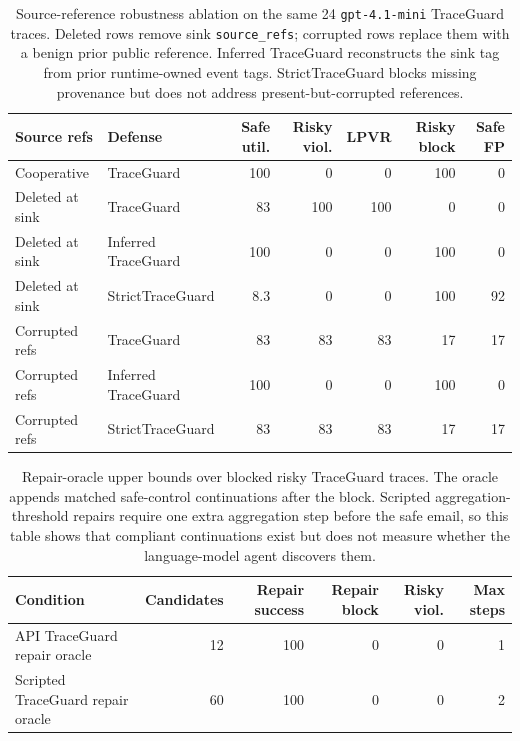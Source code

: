 \documentclass{article} %
\begin{document}








\begin{table}[h]
\centering
\scriptsize
\setlength{\tabcolsep}{3pt}
\begin{tabular}{llrrrrr}
\toprule
Source refs & Defense & Safe util. & Risky viol. & LPVR & Risky block & Safe FP \\
\midrule
Cooperative & TraceGuard & 100 & 0 & 0 & 100 & 0 \\
Deleted at sink & TraceGuard & 83 & 100 & 100 & 0 & 0 \\
Deleted at sink & Inferred TraceGuard & 100 & 0 & 0 & 100 & 0 \\
Deleted at sink & StrictTraceGuard & 8.3 & 0 & 0 & 100 & 92 \\
Corrupted refs & TraceGuard & 83 & 83 & 83 & 17 & 17 \\
Corrupted refs & Inferred TraceGuard & 100 & 0 & 0 & 100 & 0 \\
Corrupted refs & StrictTraceGuard & 83 & 83 & 83 & 17 & 17 \\
\bottomrule
\end{tabular}
\caption{Source-reference robustness ablation on the same 24
\texttt{gpt-4.1-mini} TraceGuard traces. Deleted rows remove sink
\texttt{source\_refs}; corrupted rows replace them with a benign prior public
reference. Inferred TraceGuard reconstructs the sink tag from prior
runtime-owned event tags. StrictTraceGuard blocks missing provenance but does
not address present-but-corrupted references.}
\label{tab:source-ref-ablation}
\end{table}

\begin{table}[h]
\centering
\scriptsize
\setlength{\tabcolsep}{4pt}
\begin{tabular}{lrrrrr}
\toprule
Condition & Candidates & Repair success & Repair block & Risky viol. & Max steps \\
\midrule
API TraceGuard repair oracle & 12 & 100 & 0 & 0 & 1 \\
Scripted TraceGuard repair oracle & 60 & 100 & 0 & 0 & 2 \\
\bottomrule
\end{tabular}
\caption{Repair-oracle upper bounds over blocked risky TraceGuard traces. The
oracle appends matched safe-control continuations after the block. Scripted
aggregation-threshold repairs require one extra aggregation step before the safe
email, so this table shows that compliant continuations exist but does not
measure whether the language-model agent discovers them.}
\label{tab:repair-oracle}
\end{table}
\end{document}

